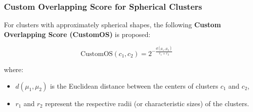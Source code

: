 \subsubsection*{Custom Overlapping Score for Spherical Clusters}

For clusters with approximately spherical shapes, the following \textbf{Custom
      Overlapping Score (CustomOS)} is proposed:

\begin{equation}\label{eq:custom_os}
      \text{CustomOS}(c_1, c_2) = 2^{- \frac{d(\mu_1, \mu_2)}{r_1 + r_2}}
\end{equation}

where:
\begin{itemize}
      \item $ d(\mu_1, \mu_2) $ is the Euclidean distance between the centers of clusters $ c_1 $ and $ c_2 $,
      \item $ r_1 $ and $ r_2 $ represent the respective radii (or characteristic sizes) of the clusters.
\end{itemize}

